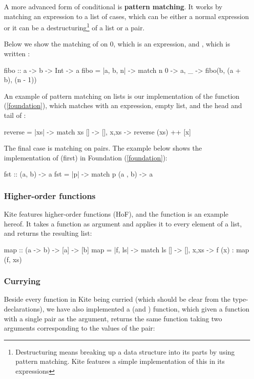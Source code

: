 A more advanced form of conditional is \textbf{pattern matching}. It works by matching an expression to a list of cases, which can be either a normal expression or it can be a destructuring\footnote{Destructuring means breaking up a data structure into its parts by using pattern matching. Kite features a simple implementation of this in its  expressions} of a list or a pair.

Below we show the matching of  on 0, which is an expression, and , which is written :

\begin{kite}
fibo :: a -> b -> Int -> a
fibo = |a, b, n| -> {
  match n {
    0 -> a,
    _ -> fibo(b, (a + b), (n - 1))
  }
}
\end{kite}

An example of pattern matching on lists is our implementation of the function  (\ref{foundation}), which matches  with an expression, empty list, and the head and tail of :

\begin{kite}
reverse = |xs| -> {
  match xs {
    []    -> [],
    x,xs  -> reverse (xs) ++ [x]
  }
}
\end{kite}

The final case is matching on pairs. The example below shows the implementation of  (first) in Foundation (\ref{foundation}):
\begin{kite}
fst :: (a, b) -> a
fst = |p| -> {
  match p {
    (a , b) -> a
  }
}
\end{kite}

\subsubsection{Higher-order functions}
Kite features higher-order functions (HoF), and the  function is an example hereof. It takes a function as argument and applies it to every element of a list, and returns the resulting list:

\begin{kite}
map :: (a -> b) -> [a] -> [b]
map = |f, ls| -> {
  match ls {
    [] -> [],
    x,xs -> f (x) : map (f, xs)
  }
}
\end{kite}

\subsubsection{Currying}
\label{subsubsec:currying}
Beside every function in Kite being curried (which should be clear from the type-declarations), we have also implemented a  (and ) function, which given a function with a single pair as the argument, returns the same function taking two arguments corresponding to the values of the pair:

